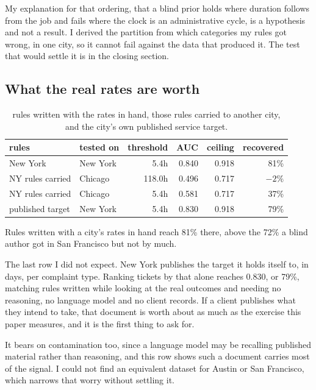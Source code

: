 \documentclass[10pt,a4paper,twocolumn]{article}
\begin{document}
My explanation for that ordering, that a blind prior holds where duration follows
from the job and fails where the clock is an administrative cycle, is a
hypothesis and not a result. I derived the partition from which categories my
rules got wrong, in one city, so it cannot fail against the data that produced
it. The test that would settle it is in the closing section.

\subsection*{What the real rates are worth}

\begin{table}[t]
\centering
\footnotesize
\begin{tabular}{llrrrr}
\toprule
rules & tested on & threshold & AUC & ceiling & recovered \\
\midrule
New York & New York & 5.4h & 0.840 & 0.918 & 81\% \\
NY rules carried & Chicago & 118.0h & 0.496 & 0.717 & $-2\%$ \\
NY rules carried & Chicago & 5.4h & 0.581 & 0.717 & 37\% \\
published target & New York & 5.4h & 0.830 & 0.918 & 79\% \\
\bottomrule
\end{tabular}
\caption{rules written with the rates in hand, those rules carried to another city, and the city's own published service target.}
\end{table}

Rules written with a city's rates in hand reach 81\% there, above the 72\% a blind
author got in San Francisco but not by much.

The last row I did not expect. New York publishes the target it holds itself to,
in days, per complaint type. Ranking tickets by that alone reaches 0.830, or 79\%,
matching rules written while looking at the real outcomes and needing no
reasoning, no language model and no client records. If a client publishes what
they intend to take, that document is worth about as much as the exercise this
paper measures, and it is the first thing to ask for.

It bears on contamination too, since a language model may be recalling published
material rather than reasoning, and this row shows such a document carries most
of the signal. I could not find an equivalent dataset for Austin or San Francisco,
which narrows that worry without settling it.
\end{document}
